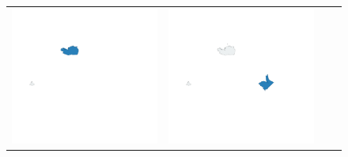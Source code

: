 \begin{figure}
\begin{tabularx}{1\textwidth}{XXXX}
\includegraphics[width=1\linewidth]{images/ch6/loading/01}&
\includegraphics[width=1\linewidth]{images/ch6/loading/02}&

\end{tabularx}
\end{figure}
